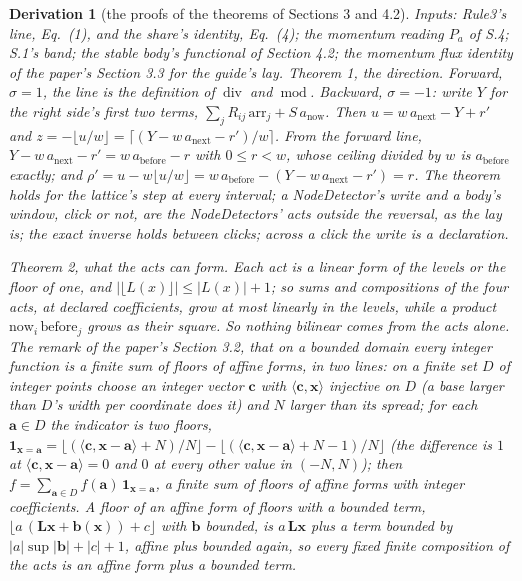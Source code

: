 \documentclass[pdflatex,sn-mathphys-num]{sn-jnl}
\newcommand{\anow}{a_{\mathrm{now}}}
\newcommand{\abefore}{a_{\mathrm{before}}}
\newcommand{\dmod}{\ \mathrm{mod}\ }
\newcommand{\anext}{a_{\mathrm{next}}}
\newcommand{\ddiv}{\ \mathrm{div}\ }
\theoremstyle{thmstyleone}
\newtheorem{derivation}{Derivation}
\begin{document}
\begin{derivation}[the proofs of the theorems of Sections 3 and 4.2]
\emph{Inputs:} Rule3's line, Eq.~(1), and the share's identity, Eq.~(4); the momentum reading $P_a$ of S.4; S.1's band; the stable body's functional of Section 4.2; the momentum flux identity of the paper's Section 3.3 for the guide's lay. \emph{Theorem 1, the direction.} Forward, $\sigma = 1$, the line is the definition of $\ddiv$ and $\dmod$. Backward, $\sigma = -1$: write $Y$ for the right side's first two terms, $\sum_j R_{ij}\,\mathrm{arr}_j + S\,\anow$. Then $u = w\,\anext - Y + r'$ and $z = -\lfloor u / w \rfloor = \lceil (Y - w\,\anext - r') / w \rceil$. From the forward line, $Y - w\,\anext - r' = w\,\abefore - r$ with $0 \le r < w$, whose ceiling divided by $w$ is $\abefore$ exactly; and $\rho' = u - w\lfloor u / w \rfloor = w\,\abefore - (Y - w\,\anext - r') = r$. The theorem holds for the lattice's step at every interval; a NodeDetector's write and a body's window, click or not, are the NodeDetectors' acts outside the reversal, as the lay is; the exact inverse holds between clicks; across a click the write is a declaration.

\emph{Theorem 2, what the acts can form.} Each act is a linear form of the levels or the floor of one, and $|\lfloor L(x)\rfloor| \le |L(x)| + 1$; so sums and compositions of the four acts, at declared coefficients, grow at most linearly in the levels, while a product $\mathrm{now}_i\,\mathrm{before}_j$ grows as their square. So nothing bilinear comes from the acts alone. The remark of the paper's Section 3.2, that on a bounded domain every integer function is a finite sum of floors of affine forms, in two lines: on a finite set $D$ of integer points choose an integer vector $\mathbf c$ with $\langle\mathbf c, \mathbf x\rangle$ injective on $D$ (a base larger than $D$'s width per coordinate does it) and $N$ larger than its spread; for each $\mathbf a \in D$ the indicator is two floors, $\mathbf 1_{\mathbf x = \mathbf a} = \lfloor(\langle\mathbf c, \mathbf x - \mathbf a\rangle + N) / N\rfloor - \lfloor(\langle\mathbf c, \mathbf x - \mathbf a\rangle + N - 1) / N\rfloor$ (the difference is $1$ at $\langle\mathbf c, \mathbf x - \mathbf a\rangle = 0$ and $0$ at every other value in $(-N, N)$); then $f = \sum_{\mathbf a \in D} f(\mathbf a)\,\mathbf 1_{\mathbf x = \mathbf a}$, a finite sum of floors of affine forms with integer coefficients. A floor of an affine form of floors with a bounded term, $\lfloor a\,(\mathbf L\mathbf x + \mathbf b(\mathbf x)) + c\rfloor$ with $\mathbf b$ bounded, is $a\,\mathbf L\mathbf x$ plus a term bounded by $|a|\sup|\mathbf b| + |c| + 1$, affine plus bounded again, so every fixed finite composition of the acts is an affine form plus a bounded term.


\end{derivation}
\end{document}
